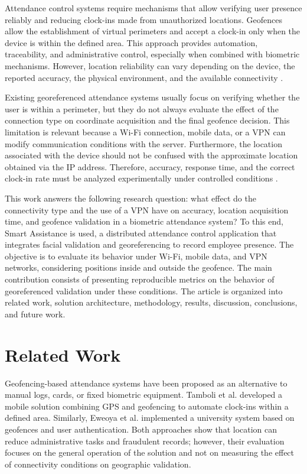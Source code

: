 \documentclass[runningheads]{llncs}
\begin{document}
Attendance control systems require mechanisms that allow verifying user presence reliably and reducing clock-ins made from unauthorized locations. Geofences allow the establishment of virtual perimeters and accept a clock-in only when the device is within the defined area. This approach provides automation, traceability, and administrative control, especially when combined with biometric mechanisms. However, location reliability can vary depending on the device, the reported accuracy, the physical environment, and the available connectivity \cite{fauzi2025,w3c2022}.

Existing georeferenced attendance systems usually focus on verifying whether the user is within a perimeter, but they do not always evaluate the effect of the connection type on coordinate acquisition and the final geofence decision. This limitation is relevant because a Wi-Fi connection, mobile data, or a VPN can modify communication conditions with the server. Furthermore, the location associated with the device should not be confused with the approximate location obtained via the IP address. Therefore, accuracy, response time, and the correct clock-in rate must be analyzed experimentally under controlled conditions \cite{w3c2022,casey2020}.

This work answers the following research question: what effect do the connectivity type and the use of a VPN have on accuracy, location acquisition time, and geofence validation in a biometric attendance system? To this end, Smart Assistance is used, a distributed attendance control application that integrates facial validation and georeferencing to record employee presence. The objective is to evaluate its behavior under Wi-Fi, mobile data, and VPN networks, considering positions inside and outside the geofence. The main contribution consists of presenting reproducible metrics on the behavior of georeferenced validation under these conditions. The article is organized into related work, solution architecture, methodology, results, discussion, conclusions, and future work.

\section{Related Work}

Geofencing-based attendance systems have been proposed as an alternative to manual logs, cards, or fixed biometric equipment. Tamboli et al. \cite{tamboli2024} developed a mobile solution combining GPS and geofencing to automate clock-ins within a defined area. Similarly, Eweoya et al. \cite{eweoya2025} implemented a university system based on geofences and user authentication. Both approaches show that location can reduce administrative tasks and fraudulent records; however, their evaluation focuses on the general operation of the solution and not on measuring the effect of connectivity conditions on geographic validation.
\end{document}
